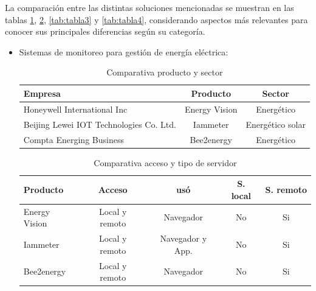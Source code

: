 La comparación entre las distintas soluciones mencionadas se muestran en las tablas \ref{tab:tabla1}, \ref{tab:tabla2},  \ref{tab:tabla3} y \ref{tab:tabla4}, considerando aspectos más relevantes para conocer sus principales diferencias según su categoría. 
\begin{itemize}
\item Sistemas de monitoreo para gestión de energía eléctrica:

\begin{table}[h]
	\centering
	\caption[Comparativa de soluciones entre producto y sector]{Comparativa producto y sector}
	\begin{tabular}{l c c }    
		\toprule
		\textbf{Empresa} 	& \textbf{Producto} & \textbf{Sector}  \\
		\midrule
		Honeywell International Inc & Energy Vision & Energético \\		
		Beijing Lewei IOT Technologies Co. Ltd.	 & Iammeter	& Energético solar \\
		Compta Energing Business	 & Bee2energy	& Energético \\
		\bottomrule
		\hline
	\end{tabular}
	\label{tab:tabla1}
\end{table}



\begin{table}[h]
	\centering
	\caption[Comparativa de soluciones entre acceso y servidor]{Comparativa acceso y tipo de servidor}
	\begin{tabular}{l c c c c }    
		\toprule
		\textbf{Producto} & \textbf{Acceso}  & \textbf{usó} & \textbf{S. local}   & \textbf{S. remoto} \\
		\midrule
		Energy Vision & Local y remoto 	& Navegador & No & Si  \\		
		Iammeter	 & Local y remoto	& Navegador y App. & No & Si  \\
		Bee2energy	 & Local y remoto	& Navegador & No & Si  \\
		\bottomrule
		\hline
	\end{tabular}
	\label{tab:tabla2}
\end{table}

\vspace{1cm}
\vspace{1cm}




\end{itemize}
